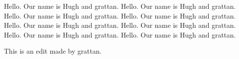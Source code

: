 \documentclass{grattanAlpha}
\begin{document}
Hello. Our name is Hugh and grattan. Hello. Our name is Hugh and grattan. Hello. Our name is Hugh and grattan. Hello. Our name is Hugh and grattan. Hello. Our name is Hugh and grattan. Hello. Our name is Hugh and grattan. Hello. Our name  is Hugh and grattan. Hello. Our name is Hugh and grattan.


This is an edit made by grattan.
\end{document}
